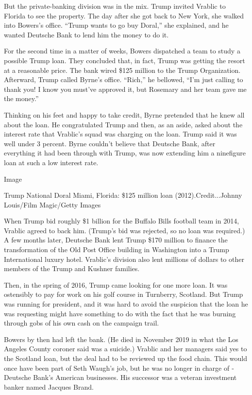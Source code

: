But the private-­banking division was in the mix. Trump invited Vrablic
to Florida to see the property. The day after she got back to New York,
she walked into Bowers's office. ``Trump wants to go buy Doral,'' she
explained, and he wanted ­Deutsche Bank to lend him the money to do it.

For the second time in a matter of weeks, Bowers dispatched a team to
study a possible Trump loan. They concluded that, in fact, Trump was
getting the resort at a reasonable price. The bank wired \$125 million
to the Trump Organization. Afterward, Trump called Byrne's office.
``Rich,'' he bellowed, ``I'm just calling to thank you! I know you
must've approved it, but Rosemary and her team gave me the money.''

Thinking on his feet and happy to take credit, Byrne pretended that he
knew all about the loan. He congratulated Trump and then, as an aside,
asked about the interest rate that Vrablic's squad was charging on the
loan. Trump said it was well under 3 percent. Byrne couldn't believe
that ­Deutsche Bank, after everything it had been through with Trump,
was now extending him a nine­figure loan at such a low interest rate.

Image

Trump National Doral Miami, Florida: \$125 million loan
(2012).Credit...Johnny Louis/Film Magic/Getty Images

When Trump bid roughly \$1 billion for the Buffalo Bills football team
in 2014, Vrablic agreed to back him. (Trump's bid was rejected, so no
loan was required.) A few months later, ­Deutsche Bank lent Trump \$170
million to finance the transformation of the Old Post Office building in
Washington into a Trump International luxury hotel. Vrablic's division
also lent millions of dollars to other members of the Trump and Kushner
families.

Then, in the spring of 2016, Trump came looking for one more loan. It
was ostensibly to pay for work on his golf course in Turnberry,
Scotland. But Trump was running for president, and it was hard to avoid
the suspicion that the loan he was requesting might have something to do
with the fact that he was burning through gobs of his own cash on the
campaign trail.

Bowers by then had left the bank. (He died in November 2019 in what the
Los Angeles County coroner said was a suicide.) Vrablic and her managers
said yes to the Scotland loan, but the deal had to be reviewed up the
food chain. This would once have been part of Seth Waugh's job, but he
was no longer in charge of ­Deutsche Bank's American businesses. His
successor was a veteran investment banker named Jacques Brand.


